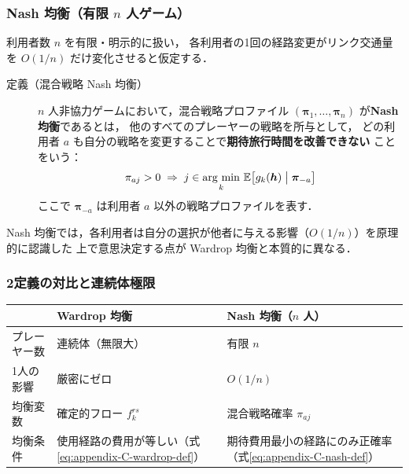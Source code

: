 \subsubsection*{Nash 均衡（有限 $n$ 人ゲーム）}

利用者数 $n$ を有限・明示的に扱い，
各利用者の1回の経路変更がリンク交通量を $O(1/n)$ だけ変化させると仮定する．

\begin{description}
  \item[定義（混合戦略 Nash 均衡）\cite{Nash1950,Nash1951}]
    $n$ 人非協力ゲームにおいて，混合戦略プロファイル $(\boldsymbol{\pi}_1, \ldots, \boldsymbol{\pi}_n)$
    が\textbf{Nash 均衡}であるとは，
    他のすべてのプレーヤーの戦略を所与として，
    どの利用者 $a$ も自分の戦略を変更することで\textbf{期待旅行時間を改善できない}
    ことをいう：
    \begin{equation}
      \pi_{aj} > 0 \;\Rightarrow\;
      j \in \mathop{\rm arg~min}_{k}\,\mathbb{E}\bigl[g_k(\boldsymbol{h})\bigm| \boldsymbol{\pi}_{-a}\bigr]
      \label{eq:appendix-C-nash-def}
    \end{equation}
    ここで $\boldsymbol{\pi}_{-a}$ は利用者 $a$ 以外の戦略プロファイルを表す．
\end{description}

Nash 均衡では，各利用者は自分の選択が他者に与える影響（$O(1/n)$）を原理的に認識した
上で意思決定する点が Wardrop 均衡と本質的に異なる．

\subsubsection*{2定義の対比と連続体極限}

\begin{center}
\small
\begin{tabular}{lp{}p{}}
  \toprule
  & Wardrop 均衡 & Nash 均衡（$n$ 人） \\
  \midrule
  プレーヤー数 & 連続体（無限大） & 有限 $n$ \\
  1人の影響 & 厳密にゼロ & $O(1/n)$ \\
  均衡変数 & 確定的フロー $f_k^{rs}$ & 混合戦略確率 $\pi_{aj}$ \\
  均衡条件 & 使用経路の費用が等しい（式\eqref{eq:appendix-C-wardrop-def}） &
             期待費用最小の経路にのみ正確率（式\eqref{eq:appendix-C-nash-def}） \\
  \bottomrule
\end{tabular}
\end{center}

